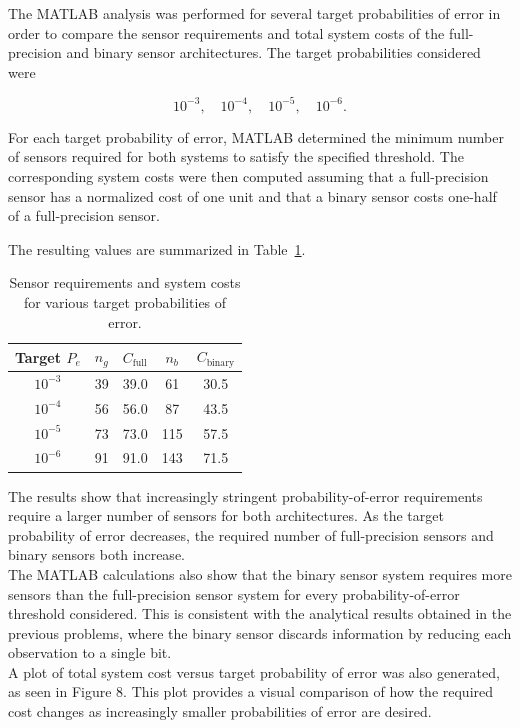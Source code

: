 \documentclass[12pt,a4paper]{article}
\begin{document}
The MATLAB analysis was performed for several target probabilities of error in order to compare the sensor requirements and total system costs of the full-precision and binary sensor architectures. The target probabilities considered were

\[
10^{-3},
\quad
10^{-4},
\quad
10^{-5},
\quad
10^{-6}.
\]

For each target probability of error, MATLAB determined the minimum number of sensors required for both systems to satisfy the specified threshold. The corresponding system costs were then computed assuming that a full-precision sensor has a normalized cost of one unit and that a binary sensor costs one-half of a full-precision sensor.

The resulting values are summarized in Table~\ref{tab:problem6results}.

\begin{table}[H]
\centering
\caption{Sensor requirements and system costs for various target probabilities of error.}
\label{tab:problem6results}
\begin{tabular}{|c|c|c|c|c|}
\hline
Target \(P_e\) &
\(n_g\) &
\(C_{\text{full}}\) &
\(n_b\) &
\(C_{\text{binary}}\) \\
\hline
\(10^{-3}\) & 39 & 39.0 & 61 & 30.5 \\
\hline
\(10^{-4}\) & 56 & 56.0 & 87 & 43.5 \\
\hline
\(10^{-5}\) & 73 & 73.0 & 115 & 57.5 \\
\hline
\(10^{-6}\) & 91 & 91.0 & 143 & 71.5 \\
\hline
\end{tabular}
\end{table}

The results show that increasingly stringent probability-of-error requirements require a larger number of sensors for both architectures. As the target probability of error decreases, the required number of full-precision sensors and binary sensors both increase.\\

The MATLAB calculations also show that the binary sensor system requires more sensors than the full-precision sensor system for every probability-of-error threshold considered. This is consistent with the analytical results obtained in the previous problems, where the binary sensor discards information by reducing each observation to a single bit.\\

A plot of total system cost versus target probability of error was also generated, as seen in Figure 8. This plot provides a visual comparison of how the required cost changes as increasingly smaller probabilities of error are desired.
\end{document}
